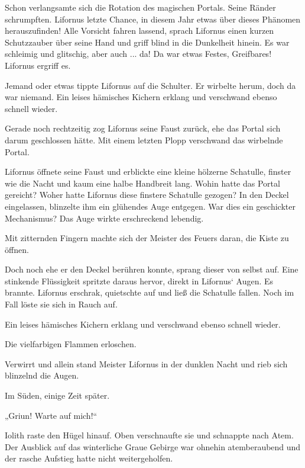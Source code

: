 Schon verlangsamte sich die Rotation des magischen Portals. Seine Ränder schrumpften. Lifornus letzte Chance, in diesem Jahr etwas über dieses Phänomen herauszufinden! Alle Vorsicht fahren lassend, sprach Lifornus einen kurzen Schutzzauber über seine Hand und griff blind in die Dunkelheit hinein. Es war schleimig und glitschig, aber auch ... da! Da war etwas Festes, Greifbares! Lifornus ergriff es.

Jemand oder etwas tippte Lifornus auf die Schulter. Er wirbelte herum, doch da war niemand. Ein leises hämisches Kichern erklang und verschwand ebenso schnell wieder.

Gerade noch rechtzeitig zog Lifornus seine Faust zurück, ehe das Portal sich darum geschlossen hätte. Mit einem letzten Plopp verschwand das wirbelnde Portal.

Lifornus öffnete seine Faust und erblickte eine kleine hölzerne Schatulle, finster wie die Nacht und kaum eine halbe Handbreit lang. Wohin hatte das Portal gereicht? Woher hatte Lifornus diese finstere Schatulle gezogen? In den Deckel eingelassen, blinzelte ihm ein glühendes Auge entgegen. War dies ein geschickter Mechanismus? Das Auge wirkte erschreckend lebendig.

Mit zitternden Fingern machte sich der Meister des Feuers daran, die Kiste zu öffnen.

Doch noch ehe er den Deckel berühren konnte, sprang dieser von selbst auf. Eine stinkende Flüssigkeit spritzte daraus hervor, direkt in Lifornus‘ Augen. Es brannte. Lifornus erschrak, quietschte auf und ließ die Schatulle fallen. Noch im Fall löste sie sich in Rauch auf.

Ein leises hämisches Kichern erklang und verschwand ebenso schnell wieder.

Die vielfarbigen Flammen erloschen.

Verwirrt und allein stand Meister Lifornus in der dunklen Nacht und rieb sich blinzelnd die Augen.






Im Süden, einige Zeit später.\bigskip



„Griun! Warte auf mich!“

Iolith raste den Hügel hinauf. Oben verschnaufte sie und schnappte nach Atem. Der Ausblick auf das winterliche Graue Gebirge war ohnehin atemberaubend und der rasche Aufstieg hatte nicht weitergeholfen.

